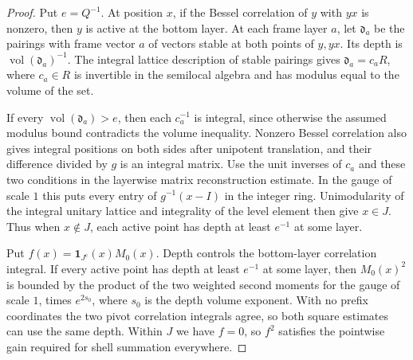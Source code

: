 \begin{proof}
Put $e=Q^{-1}$. At position $x$, if the Bessel correlation of $y$ with $yx$ is nonzero,
then $y$ is active at the bottom layer.
At each frame layer $a$, let $\mathfrak d_a$ be the pairings with frame vector $a$ of vectors stable at both points of $y,yx$.
Its depth is $\operatorname{vol}(\mathfrak d_a)^{-1}$.
The integral lattice description of stable pairings gives $\mathfrak d_a=c_aR$,
where $c_a\in R$ is invertible in the semilocal algebra and has modulus equal to the volume of the set.

If every $\operatorname{vol}(\mathfrak d_a)>e$, then each $c_a^{-1}$ is integral,
since otherwise the assumed modulus bound contradicts the volume inequality.
Nonzero Bessel correlation also gives integral positions on both sides after unipotent translation,
and their difference divided by $g$ is an integral matrix.
Use the unit inverses of $c_a$ and these two conditions in the layerwise matrix reconstruction estimate.
In the gauge of scale $1$ this puts every entry of $g^{-1}(x-I)$ in the integer ring.
Unimodularity of the integral unitary lattice and integrality of the level element then give $x\in J$.
Thus when $x\notin J$, each active point has depth at least $e^{-1}$ at some layer.

Put $f(x)=\mathbf 1_{J^{\mathrm c}}(x)M_0(x)$.
Depth controls the bottom-layer correlation integral. If every active point has depth at least $e^{-1}$ at some layer,
then $M_0(x)^2$ is bounded by the product of the two weighted second moments for the gauge of scale $1$,
times $e^{2s_0}$, where $s_0$ is the depth volume exponent.
With no prefix coordinates the two pivot correlation integrals agree, so both square estimates can use the same depth.
Within $J$ we have $f=0$, so $f^2$ satisfies the pointwise gain required for shell summation everywhere.


\end{proof}
